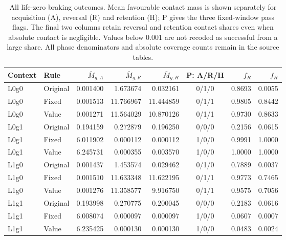 \begin{table}[htbp]\centering\scriptsize
\caption{All life-zero braking outcomes. Mean favourable contact mass is shown separately for acquisition (A), reversal (R) and retention (H); P gives the three fixed-window pass flags. The final two columns retain reversal and retention contact shares even when absolute contact is negligible. Values below 0.001 are not recoded as successful from a large share. All phase denominators and absolute coverage counts remain in the source tables.}\label{tab:brake-outcomes}
\setlength{\tabcolsep}{4pt}\begin{tabular}{llrrrcrr}\toprule
Context & Rule & $\overline M_{g,A}$ & $\overline M_{g,R}$ & $\overline M_{g,H}$ & P: A/R/H & $f_R$ & $f_H$\\\midrule
L0g0 & Original & 0.001400 & 1.673674 & 0.032161 & 0/1/0 & 0.8693 & 0.0055 \\
L0g0 & Fixed & 0.001513 & 11.766967 & 11.444859 & 0/1/1 & 0.9805 & 0.8442 \\
L0g0 & Value & 0.001271 & 11.564029 & 10.870126 & 0/1/1 & 0.9730 & 0.8633 \\
L0g1 & Original & 0.194159 & 0.272879 & 0.196250 & 0/0/0 & 0.2156 & 0.0615 \\
L0g1 & Fixed & 6.011902 & 0.000112 & 0.000112 & 1/0/0 & 0.9991 & 1.0000 \\
L0g1 & Value & 6.245731 & 0.000355 & 0.003570 & 1/0/0 & 1.0000 & 1.0000 \\
L1g0 & Original & 0.001437 & 1.453574 & 0.029462 & 0/1/0 & 0.7889 & 0.0037 \\
L1g0 & Fixed & 0.001510 & 11.633348 & 11.622195 & 0/1/1 & 0.9773 & 0.7465 \\
L1g0 & Value & 0.001276 & 11.358577 & 9.916750 & 0/1/1 & 0.9575 & 0.7056 \\
L1g1 & Original & 0.193998 & 0.270775 & 0.200045 & 0/0/0 & 0.2183 & 0.0616 \\
L1g1 & Fixed & 6.008074 & 0.000097 & 0.000097 & 1/0/0 & 0.0607 & 0.0007 \\
L1g1 & Value & 6.235425 & 0.000130 & 0.000130 & 1/0/0 & 0.0483 & 0.0024 \\
\bottomrule\end{tabular}\end{table}\FloatBarrier


